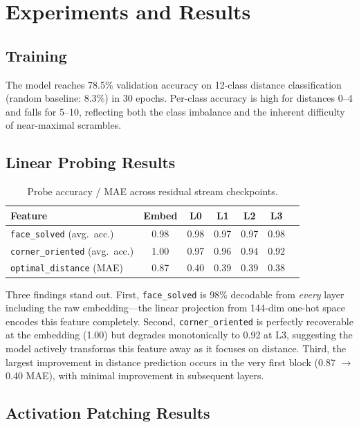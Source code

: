 \documentclass[12pt]{article}
\begin{document}
\section{Experiments and Results}

\subsection{Training}

The model reaches 78.5\% validation accuracy on 12-class distance classification
(random baseline: 8.3\%) in 30 epochs.  Per-class accuracy is high for distances
0--4 and falls for 5--10, reflecting both the class imbalance and the inherent
difficulty of near-maximal scrambles.

\subsection{Linear Probing Results}

\begin{table}[h]
\centering
\small
\begin{tabular}{lcccccc}
\toprule
Feature & Embed & L0 & L1 & L2 & L3 \\
\midrule
\texttt{face\_solved} (avg.\ acc.) & 0.98 & 0.98 & 0.97 & 0.97 & 0.98 \\
\texttt{corner\_oriented} (avg.\ acc.) & 1.00 & 0.97 & 0.96 & 0.94 & 0.92 \\
\texttt{optimal\_distance} (MAE) & 0.87 & 0.40 & 0.39 & 0.39 & 0.38 \\
\bottomrule
\end{tabular}
\caption{Probe accuracy / MAE across residual stream checkpoints.}
\label{tab:probing}
\end{table}

Three findings stand out.  First, \texttt{face\_solved} is 98\% decodable from
\emph{every} layer including the raw embedding---the linear projection from
144-dim one-hot space encodes this feature completely.  Second,
\texttt{corner\_oriented} is perfectly recoverable at the embedding (1.00) but
degrades monotonically to 0.92 at L3, suggesting the model actively transforms
this feature away as it focuses on distance.  Third, the largest improvement in
distance prediction occurs in the very first block (0.87 $\to$ 0.40 MAE), with
minimal improvement in subsequent layers.

\subsection{Activation Patching Results}
\end{document}
